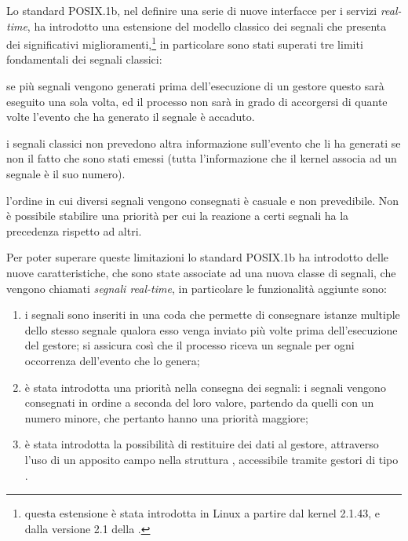 Lo standard POSIX.1b, nel definire una serie di nuove interfacce per i servizi
\textit{real-time}, ha introdotto una estensione del modello classico dei
segnali che presenta dei significativi miglioramenti,\footnote{questa
  estensione è stata introdotta in Linux a partire dal kernel 2.1.43, e dalla
  versione 2.1 della .} in particolare sono stati superati tre
limiti fondamentali dei segnali classici:
\begin{basedescript}{\desclabelwidth{1cm}\desclabelstyle{\nextlinelabel}}
\item[\textbf{I segnali non sono accumulati}] 
  se più segnali vengono generati prima dell'esecuzione di un gestore
  questo sarà eseguito una sola volta, ed il processo non sarà in grado di
  accorgersi di quante volte l'evento che ha generato il segnale è accaduto.
\item[\textbf{I segnali non trasportano informazione}]   
  i segnali classici non prevedono altra informazione sull'evento
  che li ha generati se non il fatto che sono stati emessi (tutta
  l'informazione che il kernel associa ad un segnale è il suo numero).
\item[\textbf{I segnali non hanno un ordine di consegna}] 
  l'ordine in cui diversi segnali vengono consegnati è casuale e non
  prevedibile. Non è possibile stabilire una priorità per cui la reazione a
  certi segnali ha la precedenza rispetto ad altri.
\end{basedescript}

Per poter superare queste limitazioni lo standard POSIX.1b ha introdotto delle
nuove caratteristiche, che sono state associate ad una nuova classe di
segnali, che vengono chiamati \textsl{segnali real-time}, in particolare le
funzionalità aggiunte sono:

\begin{enumerate}
\item i segnali sono inseriti in una coda che permette di consegnare istanze
  multiple dello stesso segnale qualora esso venga inviato più volte prima
  dell'esecuzione del gestore; si assicura così che il processo riceva un
  segnale per ogni occorrenza dell'evento che lo genera;
\item è stata introdotta una priorità nella consegna dei segnali: i segnali
  vengono consegnati in ordine a seconda del loro valore, partendo da quelli
  con un numero minore, che pertanto hanno una priorità maggiore;
\item è stata introdotta la possibilità di restituire dei dati al gestore,
  attraverso l'uso di un apposito campo  nella struttura
  , accessibile tramite gestori di tipo
  .
\end{enumerate}

